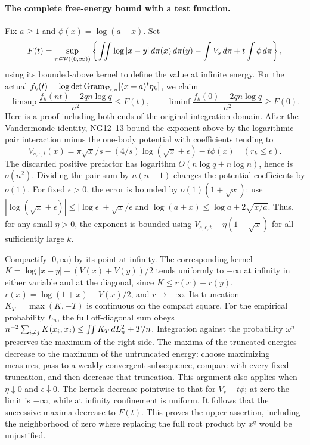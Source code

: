 \documentclass[11pt]{article}
\begin{document}
\paragraph{The complete free-energy bound with a test function.}
Fix $a\ge1$ and $\phi(x)=\log(a+x)$. Set
\[
 F(t)=\sup_{\pi\in\mathcal P((0,\infty))}
 \left\{\iint\log|x-y|\,d\pi(x)\,d\pi(y)
            -\int V_s\,d\pi+t\int\phi\,d\pi\right\},
\]
using its bounded-above kernel to define the value at infinite energy.
For the actual $f_k(t)=\log\det\operatorname{Gram}_{\mathcal P_{<n}}
 [(x+a)^t\eta_k]$, we claim
\begin{equation}\tag{NG14}
 \limsup\frac{f_k(nt)-2qn\log q}{n^2}\le F(t),\qquad
 \liminf\frac{f_k(0)-2qn\log q}{n^2}\ge F(0).
\end{equation}
Here is a proof including both ends of the original integration domain.
After the Vandermonde identity, NG12--13 bound the exponent above by
the logarithmic pair interaction minus the one-body potential with
coefficients tending to
\[
 V_{s,\epsilon,t}(x)=\pi\sqrt x/s-(4/s)\log(\sqrt x+\epsilon)-t\phi(x)
 \quad(r_k\le\epsilon).
\]
The discarded positive prefactor has logarithm $O(n\log q+n\log n)$,
hence is $o(n^2)$. Dividing the pair sum by $n(n-1)$ changes the
potential coefficients by $o(1)$. For fixed $\epsilon>0$, the error
is bounded by $o(1)(1+\sqrt x)$: use
$|\log(\sqrt x+\epsilon)|\le |\log\epsilon|+\sqrt x/\epsilon$
and $\log(a+x)\le\log a+2\sqrt{x/a}$.
Thus, for any small $\eta>0$, the exponent is bounded using
$V_{s,\epsilon,t}-\eta(1+\sqrt x)$ for all sufficiently large $k$.

Compactify $[0,\infty)$ by its point at infinity. The corresponding
kernel $K=\log|x-y|-(V(x)+V(y))/2$ tends uniformly to $-\infty$ at
infinity in either variable and at the diagonal, since
$K\le r(x)+r(y)$, $r(x)=\log(1+x)-V(x)/2$, and $r\to-\infty$.
Its truncation $K_T=\max(K,-T)$ is continuous on the compact square.
For the empirical probability $L_n$, the full off-diagonal sum obeys
$n^{-2}\sum_{i\ne j}K(x_i,x_j)\le\iint K_T\,d L_n^2+T/n$.
Integration against the probability $\omega^n$ preserves the maximum
of the right side. The maxima of the truncated energies decrease to
the maximum of the untruncated energy: choose maximizing measures,
pass to a weakly convergent subsequence, compare with every fixed
truncation, and then decrease that truncation. This argument also
applies when $\eta\downarrow0$ and $\epsilon\downarrow0$.
The kernels decrease pointwise to that for $V_s-t\phi$; at zero
the limit is $-\infty$, while at infinity confinement is uniform.
It follows that the successive maxima decrease to $F(t)$.
This proves the upper assertion, including the neighborhood of zero
where replacing the full root product by $x^q$ would be unjustified.
\end{document}
